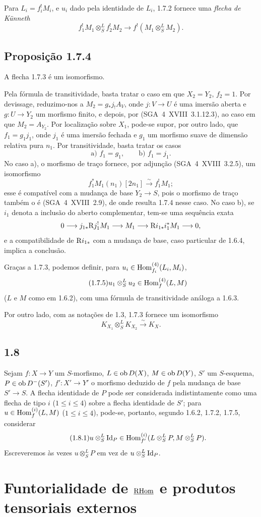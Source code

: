 Para $L_i=f_i^{!}M_i$, e $u_i$ dado pela identidade de $L_i$, 1.7.2 fornece uma \emph{flecha de Künneth}
\begin{equation}\tag{1.7.3}
f_1^{!}M_1\otimes^{L}_{S}f_2^{!}M_2\longrightarrow f^{!}(M_1\otimes^{L}_{S}M_2).
\end{equation}

\subsection*{Proposição 1.7.4}
A flecha 1.7.3 é um isomorfismo.

Pela fórmula de transitividade, basta tratar o caso em que $X_2=Y_2$, $f_2=1$. Por devissage, reduzimo-nos a $M_2=g_{*}j_{!}A_V$, onde $j:V\to U$ é uma imersão aberta e $g:U\to Y_2$ um morfismo finito, e depois, por (SGA~4~XVIII~3.1.12.3), ao caso em que $M_2=A_{Y_2}$. Por localização sobre $X_1$, pode-se supor, por outro lado, que $f_1=g_1j_1$, onde $j_1$ é uma imersão fechada e $g_1$ um morfismo suave de dimensão relativa pura $n_1$. Por transitividade, basta tratar os casos
\[
\text{a) } f_1=g_1,\qquad \text{b) } f_1=j_1.
\]
No caso a), o morfismo de traço fornece, por adjunção (SGA~4~XVIII~3.2.5), um isomorfismo
\[
f_1^{*}M_1(n_1)[2n_1]\xrightarrow{\sim}f_1^{!}M_1;
\]
esse é compatível com a mudança de base $Y_2\to S$, pois o morfismo de traço também o é (SGA~4~XVIII~2.9), de onde resulta 1.7.4 nesse caso. No caso b), se $i_1$ denota a inclusão do aberto complementar, tem-se uma sequência exata
\[
0\longrightarrow j_{1*}\mathrm{R} j_1^{!}M_1\longrightarrow M_1\longrightarrow \mathrm{R} i_{1*}i_1^{*}M_1\longrightarrow0,
\]
e a compatibilidade de $\mathrm{R} i_{1*}$ com a mudança de base, caso particular de 1.6.4, implica a conclusão.

Graças a 1.7.3, podemos definir, para $u_i\in\operatorname{Hom}_{f_i}^{(4)}(L_i,M_i)$,
\begin{equation}\tag{1.7.5}
u_1\otimes^{L}_{S}u_2\in\operatorname{Hom}_f^{(4)}(L,M)
\end{equation}
($L$ e $M$ como em 1.6.2), com uma fórmula de transitividade análoga a 1.6.3.

Por outro lado, com as notações de 1.3, 1.7.3 fornece um isomorfismo
\begin{equation}\tag{1.7.6}
K_{X_1}\otimes^{L}_{S}K_{X_2}\xrightarrow{\sim}K_X.
\end{equation}

\subsection*{1.8}
Sejam $f:X\to Y$ um $S$-morfismo, $L\in\operatorname{ob} D(X)$, $M\in\operatorname{ob} D(Y)$, $S'$ um $S$-esquema, $P\in\operatorname{ob} D^{-}(S')$, $f':X'\to Y'$ o morfismo deduzido de $f$ pela mudança de base $S'\to S$. A flecha identidade de $P$ pode ser considerada indistintamente como uma flecha de tipo $i$ ($1\leq i\leq4$) sobre a flecha identidade de $S'$; para $u\in\operatorname{Hom}_f^{(i)}(L,M)$ ($1\leq i\leq4$), pode-se, portanto, segundo 1.6.2, 1.7.2, 1.7.5, considerar
\begin{equation}\tag{1.8.1}
u\otimes^{L}_{S}\mathrm{Id}_P\in\operatorname{Hom}_{f'}^{(i)}(L\otimes^{L}_{S}P,M\otimes^{L}_{S}P).
\end{equation}
Escreveremos às vezes $u\otimes^{L}_{S}P$ em vez de $u\otimes^{L}_{S}\mathrm{Id}_P$.

\section{Funtorialidade de \texorpdfstring{$\underline{\mathrm{RHom}}$}{RHom} e produtos tensoriais externos}
